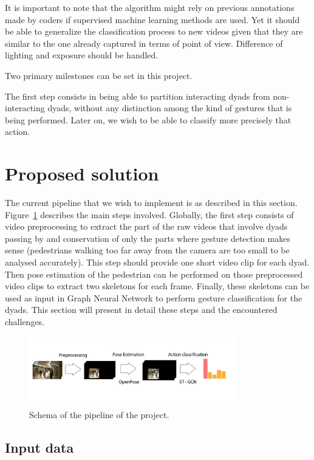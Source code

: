 \documentclass[12pt,a4paper,twoside]{article}
\begin{document}
It is important to note that the algorithm might rely on previous annotations made by coders if supervised machine learning methods are used. Yet it should be able to generalize the classification process to new videos given that they are similar to the one already captured in terms of point of view. Difference of lighting and exposure should be handled.

Two primary milestones can be set in this project.

The first step consists in being able to partition interacting dyads from non-interacting dyads, without any distinction among the kind of gestures that is being performed. Later on, we wish to be able to classify more precisely that action.

\section{Proposed solution}

The current pipeline that we wish to implement is as described in this section. Figure~\ref{fig:pipeline} describes the main steps involved. Globally, the first step consists of video preprocessing to extract the part of the raw videos that involve dyads passing by and conservation of only the parts where gesture detection makes sense (pedestrians walking too far away from the camera are too small to be analysed accurately). This step should provide one short video clip for each dyad. Then pose estimation of the pedestrian can be performed on those preprocessed video clips to extract two skeletons for each frame. Finally, these skeletons can be used as input in Graph Neural Network to perform gesture classification for the dyads. This section will present in detail these steps and the encountered challenges.  

\begin{figure}
    \centering
        \includegraphics[width=0.8\textwidth]{images/pipeline}
    \caption{Schema of the pipeline of the project.}
    \label{fig:pipeline}
\end{figure}

\subsection{Input data}
\label{sec:input}
\end{document}
